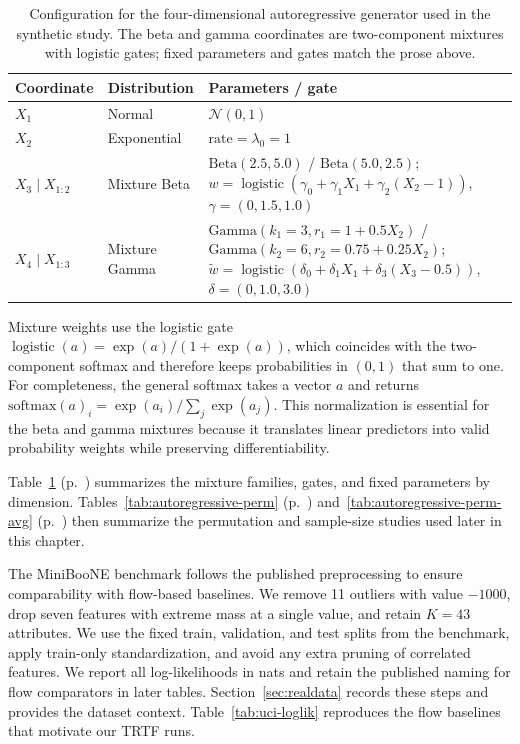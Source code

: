 \documentclass[11pt,a4paper,twoside]{book}\usepackage[]{graphicx}\usepackage[]{xcolor}
\begin{document}
\begin{table}[t]
  \centering
  \caption{Configuration for the four-dimensional autoregressive generator used in the synthetic study. The beta and gamma coordinates are two-component mixtures with logistic gates; fixed parameters and gates match the prose above.}
  \label{tab:autoregressive-config}
  \begin{tabular}{lll}
    \hline
    Coordinate & Distribution & Parameters / gate \\
    \hline
    $X_1$ & Normal & $\mathcal{N}(0,1)$ \\
    $X_2$ & Exponential & $\mathrm{rate} = \lambda_0 = 1$ \\
    $X_3 \mid X_{1:2}$ & Mixture Beta & $\mathrm{Beta}(2.5,5.0)$ / $\mathrm{Beta}(5.0,2.5)$; $w = \operatorname{logistic}(\gamma_0 + \gamma_1 X_1 + \gamma_2(X_2-1))$, $\gamma=(0,1.5,1.0)$ \\
    $X_4 \mid X_{1:3}$ & Mixture Gamma & $\mathrm{Gamma}(k_1{=}3, r_1{=}1+0.5X_2)$ / $\mathrm{Gamma}(k_2{=}6, r_2{=}0.75+0.25X_2)$; $\tilde{w} = \operatorname{logistic}(\delta_0 + \delta_1 X_1 + \delta_3(X_3-0.5))$, $\delta=(0,1.0,3.0)$ \\
    \hline
  \end{tabular}
\end{table}

Mixture weights use the logistic gate $\operatorname{logistic}(a)=\exp(a)/(1+\exp(a))$, which coincides with the two-component softmax and therefore keeps probabilities in $(0,1)$ that sum to one. For completeness, the general softmax takes a vector $a$ and returns $\mathrm{softmax}(a)_i = \exp(a_i) / \sum_j \exp(a_j)$. This normalization is essential for the beta and gamma mixtures because it translates linear predictors into valid probability weights while preserving differentiability.

Table~\ref{tab:autoregressive-config} (p.~\pageref{tab:autoregressive-config}) summarizes the mixture families, gates, and fixed parameters by dimension. Tables~\ref{tab:autoregressive-perm} (p.~\pageref{tab:autoregressive-perm}) and~\ref{tab:autoregressive-perm-avg} (p.~\pageref{tab:autoregressive-perm-avg}) then summarize the permutation and sample-size studies used later in this chapter.

The MiniBooNE benchmark follows the published preprocessing to ensure comparability with flow-based baselines. We remove 11 outliers with value $-1000$, drop seven features with extreme mass at a single value, and retain $K = 43$ attributes. We use the fixed train, validation, and test splits from the benchmark, apply train-only standardization, and avoid any extra pruning of correlated features. We report all log-likelihoods in nats and retain the published naming for flow comparators in later tables. Section~\ref{sec:realdata} records these steps and provides the dataset context. Table~\ref{tab:uci-loglik} reproduces the flow baselines that motivate our TRTF runs.
\end{document}
